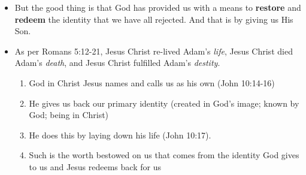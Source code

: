 \begin{itemize}
  \item{But the good thing is that God has provided us with a means to \textbf{restore} and \textbf{redeem} the identity that we have all rejected. And that is by giving us His Son.}
  \item{As per Romans 5:12-21, Jesus Christ re-lived Adam's \textit{life}, Jesus Christ died Adam's \textit{death}, and Jesus Christ fulfilled Adam's \textit{destity}.
  \begin{enumerate}
    \item{God in Christ Jesus names and calls us as his own (John 10:14-16)}
    \item{He gives us back our primary identity (created in God's image; known by God; being in Christ)}
    \item{He does this by laying down his life (John 10:17).}
    \item{Such is the worth bestowed on us that comes from the identity God gives to us and Jesus redeems back for us}
  \end{enumerate}
  
  }
\end{itemize}